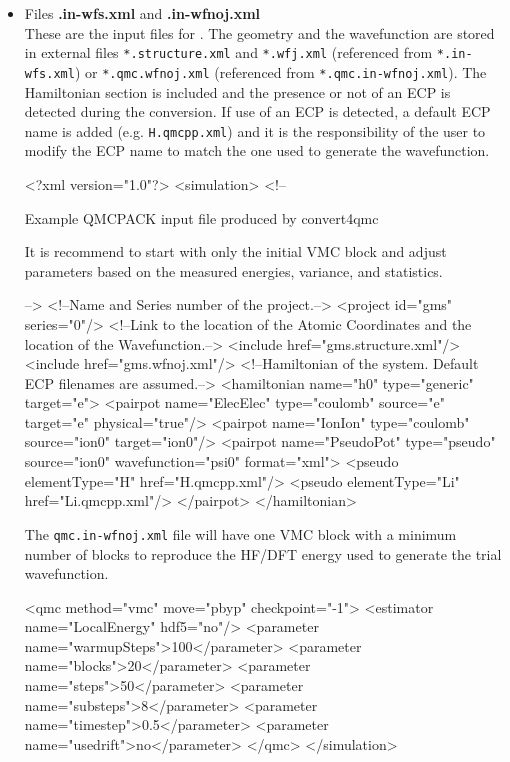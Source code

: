 \begin{itemize}
 \item Files \textbf{.in-wfs.xml} and \textbf{.in-wfnoj.xml} \\ These
   are the input files for \qmcpack.  The geometry and the
   wavefunction are stored in external files \texttt{*.structure.xml}
   and \texttt{*.wfj.xml} (referenced from \texttt{*.in-wfs.xml}) or
   \texttt{*.qmc.wfnoj.xml} (referenced from
   \texttt{*.qmc.in-wfnoj.xml}). The Hamiltonian section is included
   and the presence or not of an ECP is detected during the
   conversion. If use of an ECP is detected, a default ECP name is
   added (e.g. \texttt{H.qmcpp.xml}) and it is the responsibility of
   the user to modify the ECP name to match the one used to generate
   the wavefunction.\\
  \begin{shade}
  <?xml version="1.0"?>
<simulation>
  <!--
 
Example QMCPACK input file produced by convert4qmc
 
It is recommend to start with only the initial VMC block and adjust
parameters based on the measured energies, variance, and statistics.

-->
  <!--Name and Series number of the project.-->
  <project id="gms" series="0"/>
  <!--Link to the location of the Atomic Coordinates and the location of 
      the Wavefunction.-->
  <include href="gms.structure.xml"/>
  <include href="gms.wfnoj.xml"/>
  <!--Hamiltonian of the system. Default ECP filenames are assumed.-->
  <hamiltonian name="h0" type="generic" target="e">
    <pairpot name="ElecElec" type="coulomb" source="e" target="e" 
                                                   physical="true"/>
    <pairpot name="IonIon" type="coulomb" source="ion0" target="ion0"/>
    <pairpot name="PseudoPot" type="pseudo" source="ion0" wavefunction="psi0" 
                                                           format="xml">
      <pseudo elementType="H" href="H.qmcpp.xml"/>
      <pseudo elementType="Li" href="Li.qmcpp.xml"/>
    </pairpot>
  </hamiltonian>

 \end{shade}

 The \texttt{qmc.in-wfnoj.xml} file will have one VMC block with a
 minimum number of blocks to reproduce the HF/DFT energy used to
 generate the trial wavefunction.
 
 \begin{shade}
  <qmc method="vmc" move="pbyp" checkpoint="-1">
    <estimator name="LocalEnergy" hdf5="no"/>
    <parameter name="warmupSteps">100</parameter>
    <parameter name="blocks">20</parameter>
    <parameter name="steps">50</parameter>
    <parameter name="substeps">8</parameter>
    <parameter name="timestep">0.5</parameter>
    <parameter name="usedrift">no</parameter>
  </qmc>
</simulation>
 \end{shade}


\end{itemize}
